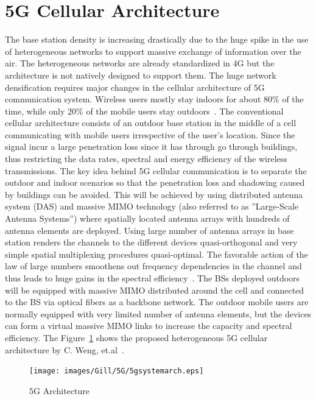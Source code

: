 \section{5G Cellular Architecture}
\label{5gcell}
The base station density is increasing drastically due to the huge spike in the use of heterogeneous networks to support massive exchange of information over the air. The heterogeneous networks are already standardized in 4G but the architecture is not natively designed to support them. The huge network densification requires major changes in the cellular architecture of 5G communication system. Wireless users mostly stay indoors for about 80\% of the time, while only 20\% of the mobile users stay outdoors~\cite{4623708}. The conventional cellular architecture consists of an outdoor base station in the middle of a cell communicating with mobile users irrespective of the user's location. Since the signal incur a large penetration loss since it has through go through buildings, thus restricting the data rates, spectral and energy efficiency of the wireless transmissions. The key idea behind 5G cellular communication is to separate the outdoor and indoor scenarios so that the penetration loss and shadowing caused by buildings can be avoided. This will be achieved by using distributed antenna system (DAS) and massive MIMO technology (also referred to as ''Large-Scale Antenna Systems'') where spatially located antenna arrays with hundreds of antenna elements are deployed. Using large number of antenna arrays in base station renders the channels to the different devices quasi-orthogonal and very simple spatial multiplexing procedures quasi-optimal. The favorable action of the law of large numbers smoothens out frequency dependencies in the channel and thus leads to huge gains in the spectral efficiency~\cite{Boccardi2014}. The BSs deployed outdoors will be equipped with massive MIMO distributed around the cell and connected to the BS via optical fibers as a backbone network. The outdoor mobile users are normally equipped with very limited number of antenna elements, but the devices can form a virtual massive MIMO links to increase the capacity and spectral efficiency. The Figure~\ref{5garch} shows the proposed heterogeneous 5G cellular architecture by C. Weng, et.al~\cite{Wang2014}. 
 
\begin{figure}[!ht]
	\centering
\texttt{[image: images/Gill/5G/5gsystemarch.eps]}
	\caption{5G Architecture}
	\label{5garch}
\end{figure}

